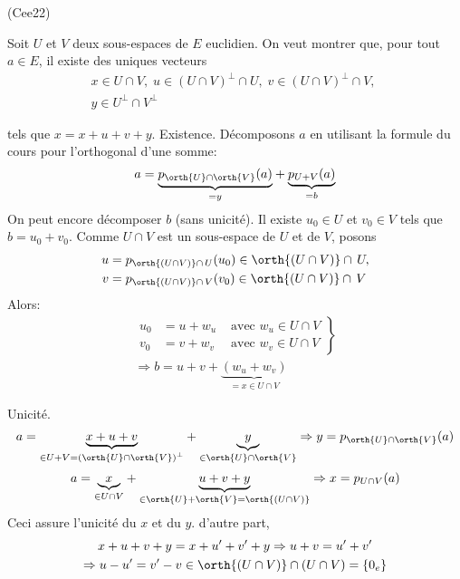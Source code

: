 \begin{tiny}(Cee22)\end{tiny} Soit $U$ et $V$ deux sous-espaces de $E$ euclidien. On veut montrer que, pour tout $a\in E$, il existe des uniques vecteurs
\begin{multline*}
  x\in U\cap V,\; u\in \left( U\cap V\right)^{\perp}\cap U,\; 
v\in \left( U\cap V\right)^{\perp}\cap V,\; \\
y\in U^{\perp}\cap V^{\perp}
\end{multline*}

tels que $x=x+u+v+y$.\newline
Existence. Décomposons $a$ en utilisant la formule du cours pour l'orthogonal d'une somme:
\begin{displaymath}
  a = \underset{=y}{\underbrace{p_{\orth{U}\cap \orth{V}}(a)}} 
  + \underset{=b}{\underbrace{p_{U+V}(a)}}
\end{displaymath}
On peut encore décomposer $b$ (sans unicité). Il existe $u_0\in U$ et $v_0\in V$ tels que $b=u_0 + v_0$.\newline
Comme $U\cap V$ est un sous-espace de $U$ et de $V$, posons
\[
\begin{aligned}
  u &= p_{\orth{\left( U\cap V\right) }\cap\, U}(u_0) \in \orth{\left( U\cap V\right)}\cap\, U, \\
  v &= p_{\orth{\left( U\cap V\right) }\cap\, V}(v_0) \in \orth{\left( U\cap V\right)}\cap\, V
\end{aligned}
\]
Alors:
\begin{multline*}
\left. 
\begin{aligned}
u_0 &= u +w_u &\text{ avec }  w_u\in U\cap V \\ 
v_0 &= v +w_v &\text{ avec }  w_v\in U\cap V 
\end{aligned}
\right\rbrace \\ 
\Rightarrow
b = u +v + \underset{=x\in U\cap V}{\underbrace{(w_u+w_v)}}
\end{multline*}

Unicité.
\begin{displaymath}
  a = \underset{\in U+ V = \left( \orth{U}\cap \orth{V}\right)^{\perp} }{\underbrace{x+ u + v}} + \underset{\in \orth{U}\cap \orth{V}}{\underbrace{y}} 
  \Rightarrow y = p_{\orth{U}\cap \orth{V}}(a)
\end{displaymath}
\begin{displaymath}
  a = \underset{\in U\cap V}{\underbrace{x}} + \underset{\in \orth{U}+ \orth{V}=\orth{(U\cap V)} }{\underbrace{u + v + y}} 
  \Rightarrow x = p_{U\cap V}(a)
\end{displaymath}
Ceci assure l'unicité du $x$ et du $y$. d'autre part,
\begin{multline*}
  x+u+v+y= x+u'+v'+y 
\Rightarrow u+v = u'+v'\\
\Rightarrow u-u' = v'-v \in \orth{\left( U\cap V\right)} \cap \left( U\cap V\right) = \left\lbrace 0_e \right\rbrace  
\end{multline*}

